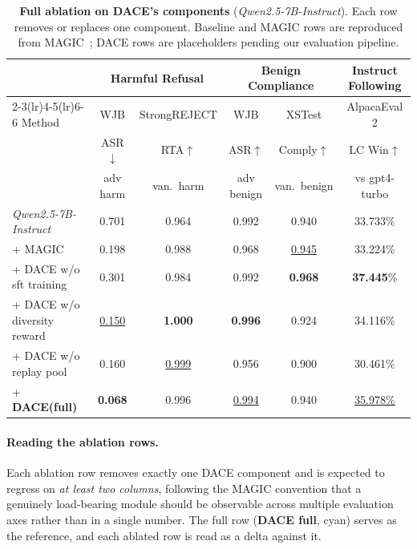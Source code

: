 \documentclass{article}
\newcommand{\method}{\textsc{DACE}\xspace}
\begin{document}
\begin{table}[ht]
\centering
\caption{\textbf{Full ablation on \method's components} (\textit{Qwen2.5-7B-Instruct}). Each row removes or replaces one component. Baseline and MAGIC rows are reproduced from MAGIC~\citep{magic2025}; \method rows are placeholders pending our evaluation pipeline.}
\label{tab:ablation-full}
\setlength{\tabcolsep}{0.5pt}
\renewcommand{\arraystretch}{1.15}
\scriptsize
\begin{tabular}{lccccc}
\toprule
& \multicolumn{2}{c}{Harmful Refusal} & \multicolumn{2}{c}{Benign Compliance} & Instruct Following \\
\cmidrule(lr){2-3}\cmidrule(lr){4-5}\cmidrule(lr){6-6}
Method & WJB & StrongREJECT & WJB & XSTest & AlpacaEval 2 \\
 & ASR$\downarrow$ & RTA$\uparrow$ & ASR$\uparrow$ & Comply$\uparrow$ & LC Win$\uparrow$ \\
 & adv harm & van.\ harm & adv benign & van.\ benign & vs gpt4-turbo \\
\midrule
\textit{Qwen2.5-7B-Instruct}            & 0.701 & 0.964 & 0.992 & 0.940 & 33.733\% \\
\quad + MAGIC                           & 0.198 & 0.988 & 0.968 & \underline{0.945} & 33.224\% \\
\quad + \method w/o sft training        & 0.301 & 0.984 & 0.992 & \textbf{0.968} & \textbf{37.445}\% \\
\quad + \method w/o diversity reward    & \underline{0.150} & \textbf{1.000} & \textbf{0.996} & 0.924 & 34.116\% \\
\quad + \method w/o replay pool         & 0.160 & \underline{0.999} & 0.956 & 0.900 & 30.461\% \\
\cellcolor{cyan!15}\quad + \textbf{\method (full)} & \cellcolor{cyan!15}\textbf{0.068} & \cellcolor{cyan!15}0.996 & \cellcolor{cyan!15}\underline{0.994} & \cellcolor{cyan!15}0.940 & \cellcolor{cyan!15}\underline{35.978\%} \\
\bottomrule
\end{tabular}
\end{table}

\paragraph{Reading the ablation rows.}
Each ablation row removes exactly one \method component and is expected to regress on \emph{at least two columns}, following the MAGIC convention that a genuinely load-bearing module should be observable across multiple evaluation axes rather than in a single number. The full row (\textbf{\method full}, cyan) serves as the reference, and each ablated row is read as a delta against it.
\end{document}

